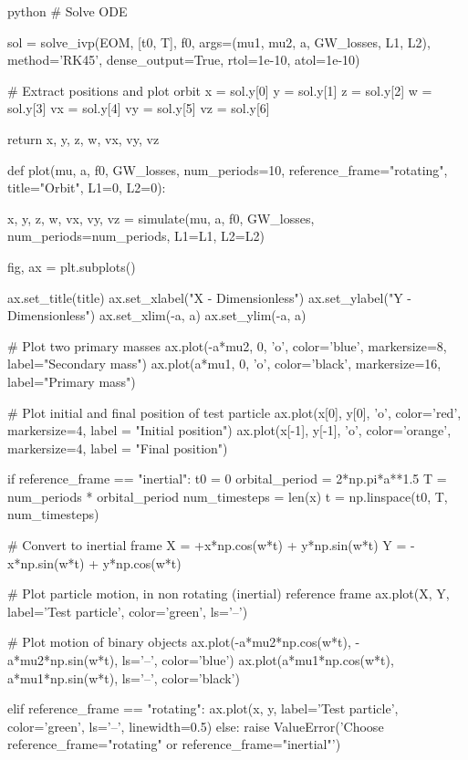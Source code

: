 \documentclass{article}
\begin{document}
\begin{mintedbox}{python}
    # Solve ODE

    sol = solve_ivp(EOM, [t0, T], f0, args=(mu1, mu2, a, GW_losses, L1, L2), method='RK45', dense_output=True, rtol=1e-10, atol=1e-10)

    # Extract positions and plot orbit
    x = sol.y[0]
    y = sol.y[1]
    z = sol.y[2]
    w = sol.y[3]
    vx = sol.y[4]
    vy = sol.y[5]
    vz = sol.y[6]

    return x, y, z, w, vx, vy, vz


def plot(mu, a, f0, GW_losses, num_periods=10, reference_frame="rotating", title="Orbit", L1=0, L2=0):
    
    x, y, z, w, vx, vy, vz = simulate(mu, a, f0, GW_losses, num_periods=num_periods, L1=L1, L2=L2)
        
    fig, ax = plt.subplots()
    
    ax.set_title(title)
    ax.set_xlabel("X - Dimensionless")
    ax.set_ylabel("Y - Dimensionless")
    ax.set_xlim(-a, a)
    ax.set_ylim(-a, a)
    
    # Plot two primary masses
    ax.plot(-a*mu2, 0, 'o', color='blue', markersize=8, label="Secondary mass")
    ax.plot(a*mu1, 0, 'o', color='black', markersize=16, label="Primary mass")

    # Plot initial and final position of test particle
    ax.plot(x[0], y[0], 'o', color='red', markersize=4, label = "Initial position")
    ax.plot(x[-1], y[-1], 'o', color='orange', markersize=4, label = "Final position")
    
    
    if reference_frame == "inertial":
        t0 = 0
        orbital_period = 2*np.pi*a**1.5
        T = num_periods * orbital_period
        num_timesteps = len(x)
        t = np.linspace(t0, T, num_timesteps)

        # Convert to inertial frame
        X = +x*np.cos(w*t) + y*np.sin(w*t)
        Y = -x*np.sin(w*t) + y*np.cos(w*t)
        
        # Plot particle motion, in non rotating (inertial) reference frame
        ax.plot(X, Y, label='Test particle', color='green', ls='--')
        
        # Plot motion of binary objects
        ax.plot(-a*mu2*np.cos(w*t), -a*mu2*np.sin(w*t), ls='--', color='blue')
        ax.plot(a*mu1*np.cos(w*t), a*mu1*np.sin(w*t), ls='--', color='black')

    elif reference_frame == "rotating":
        ax.plot(x, y, label='Test particle', color='green', ls='--', linewidth=0.5)
    else:
        raise ValueError('Choose reference_frame="rotating" or reference_frame="inertial"')
        

\end{mintedbox}
\end{document}
